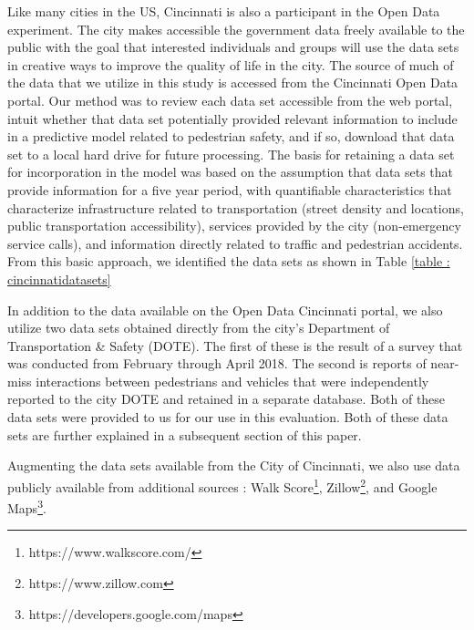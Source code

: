 \documentclass{llncs}
\begin{document}
Like many cities in the US, Cincinnati is also a participant in the Open Data experiment. The city makes accessible the government data freely available to the public with the goal that interested individuals and groups will use the data sets in creative ways to improve the quality of life in the city. The source of much of the data that we utilize in this study is accessed from the Cincinnati Open Data portal. Our method was to review each data set accessible from the web portal, intuit whether that data set potentially provided relevant information to include in a predictive model related to pedestrian safety, and if so, download that data set to a local hard drive for future processing. The basis for retaining a data set for incorporation in the model was based on the assumption that data sets that provide information for a five year period, with quantifiable characteristics that characterize infrastructure related to transportation (street density and locations, public transportation accessibility), services provided by the city (non-emergency service calls), and information directly related to traffic and pedestrian accidents. From this basic approach, we identified the data sets as shown in Table \ref{table : cincinnatidatasets}

In addition to the data available on the Open Data Cincinnati portal, we also utilize two data sets obtained directly from the city's Department of Transportation \& Safety (DOTE). The first of these is the result of a survey that was conducted from February through April 2018. The second is reports of near-miss interactions between pedestrians and vehicles that were independently reported to the city DOTE and retained in a separate database. Both of these data sets were provided to us for our use in this evaluation. Both of these data sets are further explained in a subsequent section of this paper.

Augmenting the data sets available from the City of Cincinnati, we also use data publicly available from additional sources : Walk Score\textsuperscript{\tiny\textregistered}\footnote{https://www.walkscore.com/}, Zillow\footnote{https://www.zillow.com}, and Google Maps\footnote{https://developers.google.com/maps}.
\end{document}
